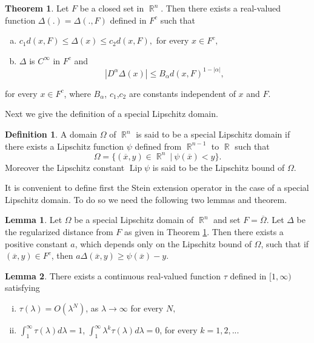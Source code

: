 \documentclass[12pt]{article}
\theoremstyle{definition}
\newtheorem{definition}{Definition}
\newtheorem{theorem}{Theorem}
\newtheorem{lemma}{Lemma}
\DeclareMathOperator\Lip{Lip}
\DeclareMathOperator\rr{\mathbb{R}}
\begin{document}
\begin{theorem}\label{regdist}
Let $F$ be a closed set in $\rr^n$. Then there exists a real-valued function $\Delta(.)=\Delta(.,F)$ defined in $F^c$ such that
\begin{enumerate}[a)]
\item $c_1 d(x,F)\le \Delta(x)\le c_2d (x,F),$ for every $x \in F^c,$  
\item $\Delta$ is $C^\infty$ in $F^c$ and
\[ \left | D^\alpha \Delta(x) \right | \le B_\alpha d(x,F)^{1-|\alpha|},\]
\end{enumerate}
for every $x \in F^c$, where $B_\alpha$, $c_1$,$c_2$ are constants independent of $x$ and $F$.
\end{theorem}
Next we give the definition of a special Lipschitz domain.
\begin{definition}
A domain $\Omega$ of $\rr^n$ is said to be a special Lipschitz domain if there exists a Lipschitz function $\psi$ defined from $\rr^{n-1}$ to $\rr$ such that
\[ \Omega=\{(\overline x, y) \in \rr^n \ | \ \psi(\overline x)<y \}.\]
Moreover the Lipschitz constant $\Lip \psi$ is said to be the Lipschitz bound of $\Omega.$ 
\end{definition}
It is convenient to define first the Stein extension operator in the case of a special Lipschitz domain. To do so we need the following two lemmas and  theorem.
\begin{lemma}\label{lemma1}
Let $\Omega$ be a special Lipschitz domain of $\rr^n$ and set $F=\overline \Omega$. Let $\Delta$ be the regularized distance from $F$ as given in Theorem \ref{regdist}. Then there exists a positive constant $a$, which depends only on the Lipschitz bound of $\Omega$, such that if $(\overline x, y) \in F^c$, then $a\Delta(\overline x,y)\ge \psi(\overline x)- y.$
\end{lemma}

\begin{lemma}\label{lemma2}
There exists a continuous real-valued function $\tau$ defined in $[1,\infty)$ satisfying
\begin{enumerate}[i)]
	\item $\tau(\lambda)=O(\lambda^N)$, as $\lambda \rightarrow \infty$ for every $N,$
	\item $\int_1^\infty \tau(\lambda)d\lambda=1$, $\int_1^\infty \lambda^k\tau(\lambda)d\lambda=0$, for every $k=1,2,...$
\end{enumerate}
\end{lemma}
\end{document}
